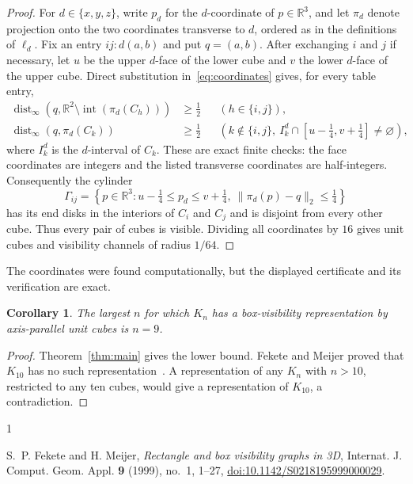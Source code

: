 \documentclass[11pt]{amsart}
\newtheorem{corollary}[theorem]{Corollary}
\begin{document}
\begin{proof}
\newpage

For $d\in\{x,y,z\}$, write $p_d$ for the $d$-coordinate of
$p\in\mathbb R^3$, and let $\pi_d$ denote projection onto the two
coordinates transverse to $d$, ordered as in the definitions of
$\ell_d$. Fix an entry $ij:d(a,b)$ and put $q=(a,b)$. After exchanging
$i$ and $j$ if necessary, let $u$ be the upper $d$-face of the lower
cube and $v$ the lower $d$-face of the upper cube. Direct substitution
in~\eqref{eq:coordinates} gives, for every table entry,
\begin{align*}
 \operatorname{dist}_\infty\!\left(
 q,\mathbb R^2\setminus\operatorname{int}(\pi_d(C_h))\right)
 &\ge \frac12
 &&(h\in\{i,j\}),\\
 \operatorname{dist}_\infty(q,\pi_d(C_k))
 &\ge \frac12
 &&\left(
 k\notin\{i,j\},\
 I_k^d\cap[u-\tfrac14,v+\tfrac14]\ne\varnothing
 \right),
\end{align*}
where $I_k^d$ is the $d$-interval of $C_k$. These are exact finite
checks: the face coordinates are integers and the listed transverse
coordinates are half-integers. Consequently the cylinder
\[
 \Gamma_{ij}
 =
 \left\{
 p\in\mathbb R^3:
 u-\tfrac14\le p_d\le v+\tfrac14,\
 \|\pi_d(p)-q\|_2\le\tfrac14
 \right\}
\]
has its end disks in the interiors of $C_i$ and $C_j$ and is disjoint
from every other cube. Thus every pair of cubes is visible. Dividing
all coordinates by $16$ gives unit cubes and visibility channels of
radius $1/64$.
\end{proof}

The coordinates were found computationally, but the displayed
certificate and its verification are exact.

\begin{corollary}
The largest $n$ for which $K_n$ has a box-visibility representation
by axis-parallel unit cubes is $n=9$.
\end{corollary}

\begin{proof}
Theorem~\ref{thm:main} gives the lower bound. Fekete and Meijer proved
that $K_{10}$ has no such representation~\cite[Theorem~25]{FM}.
A representation of any $K_n$ with $n>10$, restricted to any ten
cubes, would give a representation of $K_{10}$, a contradiction.
\end{proof}

\begin{thebibliography}{1}

S.~P. Fekete and H. Meijer,
\emph{Rectangle and box visibility graphs in 3D},
Internat. J. Comput. Geom. Appl.
\textbf{9} (1999), no.~1, 1--27,
\href{https://doi.org/10.1142/S0218195999000029}
{doi:10.1142/S0218195999000029}.

\end{thebibliography}
\end{document}
